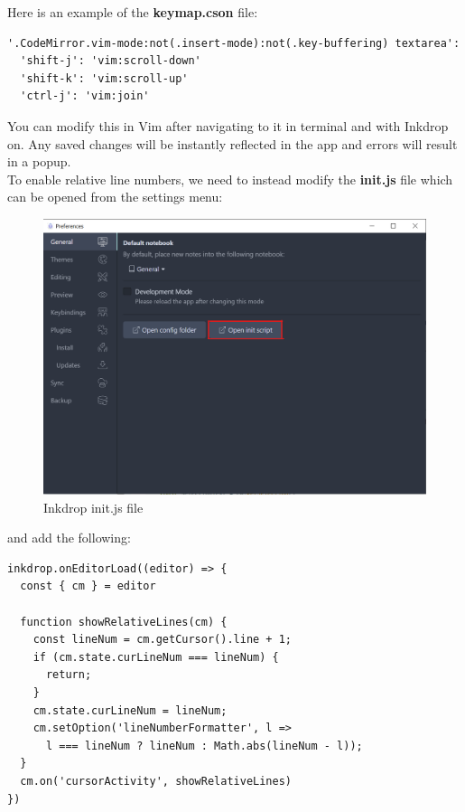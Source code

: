 Here is an example of the \textbf{keymap.cson} file:
\begin{lstlisting}
'.CodeMirror.vim-mode:not(.insert-mode):not(.key-buffering) textarea':
  'shift-j': 'vim:scroll-down'
  'shift-k': 'vim:scroll-up'
  'ctrl-j': 'vim:join'
\end{lstlisting}
You can modify this in Vim after navigating to it in terminal and with Inkdrop
on. Any saved changes will be instantly reflected in the app and errors will
result in a popup.\\

To enable relative line numbers, we need to instead modify the \textbf{init.js}
file which can be opened from the settings menu:
\begin{figure}[H]
    \centering
    \includegraphics[scale=\figscale]{Figures/inkdrop_init_file.png}
    \caption{Inkdrop init.js file}
    \label{FigInkdropInitFile}
\end{figure}
and add the following:
\begin{lstlisting}
inkdrop.onEditorLoad((editor) => {
  const { cm } = editor

  function showRelativeLines(cm) {
    const lineNum = cm.getCursor().line + 1;
    if (cm.state.curLineNum === lineNum) {
      return;
    }
    cm.state.curLineNum = lineNum;
    cm.setOption('lineNumberFormatter', l =>
      l === lineNum ? lineNum : Math.abs(lineNum - l));
  }
  cm.on('cursorActivity', showRelativeLines)
})
\end{lstlisting}
